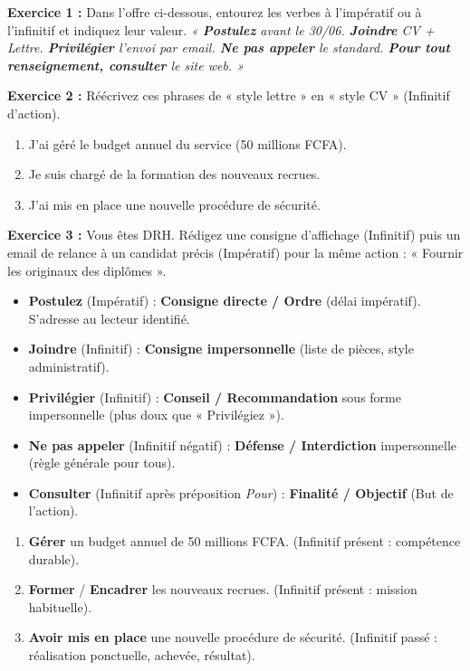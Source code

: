 \documentclass[11pt]{article}
\begin{document}
\begin{exercice}
\textbf{Exercice 1 :} Dans l'offre ci-dessous, entourez les verbes à l'impératif ou à l'infinitif et indiquez leur valeur.
\textit{« \textbf{Postulez} avant le 30/06. \textbf{Joindre} CV + Lettre. \textbf{Privilégier} l'envoi par email. \textbf{Ne pas appeler} le standard. \textbf{Pour tout renseignement, consulter} le site web. »}

\textbf{Exercice 2 :} Réécrivez ces phrases de « style lettre » en « style CV » (Infinitif d'action).
\begin{enumerate}
    \item J'ai géré le budget annuel du service (50 millions FCFA).
    \item Je suis chargé de la formation des nouveaux recrues.
    \item J'ai mis en place une nouvelle procédure de sécurité.
\end{enumerate}

\textbf{Exercice 3 :} Vous êtes DRH. Rédigez une consigne d'affichage (Infinitif) puis un email de relance à un candidat précis (Impératif) pour la même action : « Fournir les originaux des diplômes ».
\end{exercice}

\begin{corrige}[Exercice 1]
\begin{itemize}
    \item \textbf{Postulez} (Impératif) : \textbf{Consigne directe / Ordre} (délai impératif). S'adresse au lecteur identifié.
    \item \textbf{Joindre} (Infinitif) : \textbf{Consigne impersonnelle} (liste de pièces, style administratif).
    \item \textbf{Privilégier} (Infinitif) : \textbf{Conseil / Recommandation} sous forme impersonnelle (plus doux que « Privilégiez »).
    \item \textbf{Ne pas appeler} (Infinitif négatif) : \textbf{Défense / Interdiction} impersonnelle (règle générale pour tous).
    \item \textbf{Consulter} (Infinitif après préposition \emph{Pour}) : \textbf{Finalité / Objectif} (But de l'action).
\end{itemize}
\end{corrige}

\begin{corrige}[Exercice 2]
\begin{enumerate}
    \item \textbf{Gérer} un budget annuel de 50 millions FCFA. (Infinitif présent : compétence durable).
    \item \textbf{Former} / \textbf{Encadrer} les nouveaux recrues. (Infinitif présent : mission habituelle).
    \item \textbf{Avoir mis en place} une nouvelle procédure de sécurité. (Infinitif passé : réalisation ponctuelle, achevée, résultat).
\end{enumerate}
\end{corrige}
\end{document}
